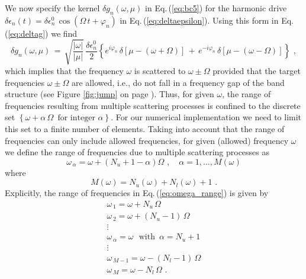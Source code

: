 We now specify the kernel $\delta g_n(\omega, \mu)$ in Eq.\,(\ref{eq:bc5}) for the harmonic drive $\delta \epsilon_n(t) = \delta \epsilon_n^0 \, \cos(\Omega \, t + \varphi_n)$
in Eq.\,(\ref{eq:deltaepsilon}). Using this form in Eq.\,(\ref{eq:deltag}) we find
%
\begin{equation} \label{eq:deltag_harm}
\delta g_n(\omega, \mu) \, = \, \sqrt{\frac{|\omega|}{|\mu|}} \, \frac{\delta \epsilon_n^0}{2} 
\left\{
e^{i \varphi_n} \, \delta\left[\mu - (\omega + \Omega)\right] \, + \,  
e^{- i \varphi_n} \, \delta\left[\mu - (\omega - \Omega)\right]
\right\} \, \, ,
\end{equation}
%
which implies that the frequency $\omega$ is scattered to $\omega \pm \Omega$
provided that the target frequencies $\omega \pm \Omega$ are allowed, i.e., 
do not fall in a frequency gap of the band structure
(see Figure \ref{fig:jump} on page \pageref{fig:jump}). 
Thus, for given $\omega$, the range of frequencies resulting from multiple scattering 
processes is confined to the discrete set 
$\left\{\omega + \alpha \, \Omega \, \, \, \text{for integer} \, \, \alpha \right\}$. 
For our numerical implementation we need to limit this set to a finite number 
of elements. Taking into account that the range of frequencies can only include 
allowed frequencies, for given (allowed) frequency $\omega$ we define the range of 
frequencies due to multiple scattering processes as
%
\begin{equation} \label{eq:omega_range}
\omega_{\,\alpha} = \omega + \left( N_u + 1 - \alpha \right) \Omega \, \, , \quad \alpha = 1, \ldots, M(\omega)
\end{equation}
%
where 
%
\begin{equation} \label{eq:def_m}
M(\omega) = N_u(\omega) + N_l(\omega) + 1 \, \, .
\end{equation}
%
Explicitly, the range of frequencies in Eq.\,(\ref{eq:omega_range}) is given by 
%
\begin{equation} \label{eq:table}
\begin{array}{l}
\omega_{\,1} = \omega + N_u \, \Omega \\
\omega_{\,2} = \omega + (N_u - 1) \, \Omega \\
\vdots \\
\omega_{\,\alpha} = \omega \, \, \, \, \text{with} \, \, \, \alpha = N_u + 1 \\
\vdots \\
\omega_{\,M-1} = \omega - (N_l - 1) \, \Omega \\
\omega_{\,M} = \omega - N_l \, \Omega \, \, .
\end{array}
\end{equation}
